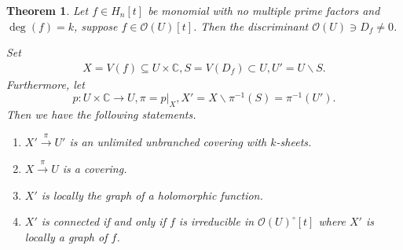 \documentclass{article}
\newtheorem{theorem}{Theorem} [section]
\newcommand{\C}[0]{\mathbb{C}}
\begin{document}
\begin{theorem}
  Let $f\in H_n[t]$ be monomial with no multiple prime factors and $\deg(f) = k$, suppose $f\in\mathcal{O}(U)[t]$. Then the discriminant $\mathcal{O}(U)\ni D_f\not=0$.
  \par Set 
  \begin{align*}
    X = V(f)\subseteq U\times\C, S = V(D_f)\subset U, U' = U\backslash S.
  \end{align*}
  Furthermore, let 
  \begin{equation*}
    p:U\times \C\to U, \pi = p|_X, X' = X\backslash \pi^{-1}(S)=\pi^{-1}(U').
  \end{equation*}
  Then we have the following statements.
  \begin{enumerate}
    \item $X'\stackrel{\pi}{\to}U'$ is an unlimited unbranched covering with $k$-sheets.
    \item $X\stackrel{\pi}{\to}U$ is a covering.
    \item $X'$ is locally the graph of a holomorphic function.
    \item $X'$ is connected if and only if $f$ is irreducible in $\mathcal{O}(U)^\circ[t]$ where $X'$ is locally a graph of $f$.
  \end{enumerate}
\end{theorem}
\end{document}
